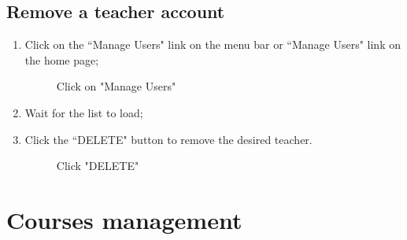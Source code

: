 \documentclass[ManualeUtente]{subfiles}
\begin{document}
	\subsection{Remove a teacher account}
	\begin{enumerate}
		\item Click on the \textquotedblleft Manage Users" link on the menu bar or \textquotedblleft Manage Users" link on the home page;
		\begin{figure}[H]
			\centering
			\caption{Click on "Manage Users"}
			\label{fig:Click on "Manage Users"}
		\end{figure}
		\item Wait for the list to load;
		\item Click the \textquotedblleft DELETE" button to remove the desired teacher.
		\begin{figure}[H]
			\centering
			\caption{Click "DELETE"}
			\label{fig:Click "DELETE"}
		\end{figure}
	\end{enumerate}
	
	
	\section{Courses management}
\end{document}
